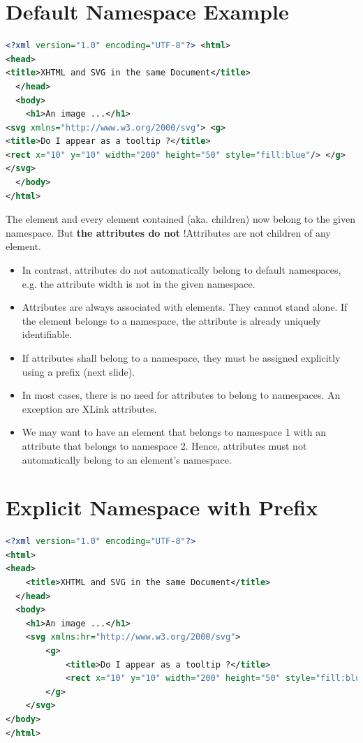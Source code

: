 \section{Default Namespace Example}

\begin{lstlisting}[language=XML, caption={Default Namespace}]
<?xml version="1.0" encoding="UTF-8"?> <html>
<head>
<title>XHTML and SVG in the same Document</title>
  </head>
  <body>
    <h1>An image ...</h1>
<svg xmlns="http://www.w3.org/2000/svg"> <g>
<title>Do I appear as a tooltip ?</title>
<rect x="10" y="10" width="200" height="50" style="fill:blue"/> </g>
</svg>
  </body>
</html>
\end{lstlisting}
The element  and every element contained (aka. children) now belong to the given namespace. But \textbf{the attributes do not} !Attributes are not children of any element.

\begin{itemize}
\item In contrast, attributes do not automatically belong to default namespaces, e.g. the attribute width is not in the given namespace.
\item Attributes are always associated with elements. They cannot stand alone. If the element belongs to a namespace, the attribute is already uniquely identifiable.
\item If attributes shall belong to a namespace, they must be assigned explicitly using a prefix (next slide).
\item In most cases, there is no need for attributes to belong to namespaces. An exception are XLink attributes.
\item We may want to have an element that belongs to namespace 1 with an attribute that belongs to namespace 2. Hence, attributes must not automatically belong to an element’s namespace.
\end{itemize}

\section{Explicit Namespace with Prefix}
\begin{lstlisting}[language=XML, caption={Default Namespace}]
<?xml version="1.0" encoding="UTF-8"?> 
<html>
<head>
	<title>XHTML and SVG in the same Document</title>
  </head>
  <body>
	<h1>An image ...</h1>
	<svg xmlns:hr="http://www.w3.org/2000/svg">
		<g>
			<title>Do I appear as a tooltip ?</title>
			<rect x="10" y="10" width="200" height="50" style="fill:blue"/>
		</g> 
	</svg>
</body>
</html>
\end{lstlisting}

